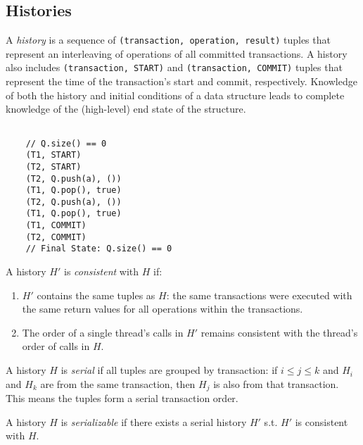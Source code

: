\subsection{Histories}
\begin{defn}
    A \emph{history} is a sequence of \texttt{(transaction, operation, result)} tuples that represent an interleaving of operations of all committed transactions. A history also includes \texttt{(transaction, START)} and \texttt{(transaction, COMMIT)} tuples that represent the time of the transaction's start and commit, respectively. Knowledge of both the history and initial conditions of a data structure leads to complete knowledge of the (high-level) end state of the structure.

\begin{eg}
    \singlespacing   

    \begin{lstlisting}

    // Q.size() == 0 
    (T1, START)
    (T2, START)
    (T2, Q.push(a), ())
    (T1, Q.pop(), true)
    (T2, Q.push(a), ())
    (T1, Q.pop(), true)
    (T1, COMMIT)
    (T2, COMMIT)
    // Final State: Q.size() == 0 
    \end{lstlisting}
    \doublespacing
\end{eg}

\end{defn}

\begin{defn}
    A history $H'$ is \emph{consistent} with $H$ if:
    \begin{enumerate}
        \item $H'$ contains the same tuples as $H$: the same transactions were executed with the same return values for all operations within the transactions.
        \item The order of a single thread's calls in $H'$ remains consistent with the thread's order of calls in $H$.
    \end{enumerate}
\end{defn}

\begin{defn}
    A history $H$ is \emph{serial} if all tuples are grouped by transaction: if $i\le j\le k$ and $H_i$ and $H_k$ are from the same transaction, then $H_j$ is also from that transaction. This means the tuples form a serial transaction order.
\end{defn}
\begin{defn}
    A history $H$ is \emph{serializable} if there exists a serial history $H'$ s.t. $H'$ is consistent with $H$.

\end{defn}

